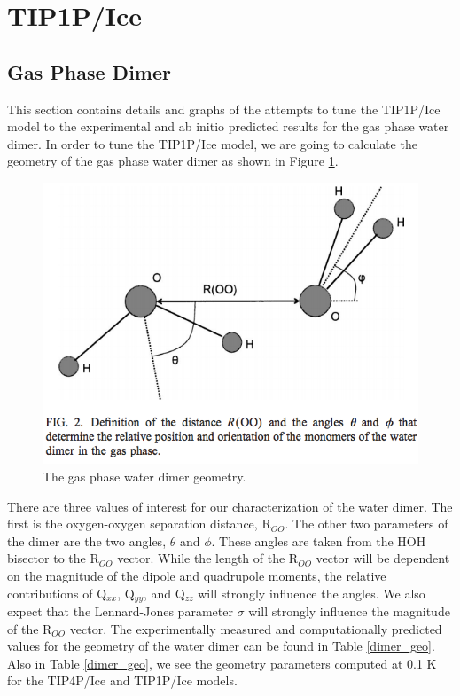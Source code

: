 \section{TIP1P/Ice}
\subsection{Gas Phase Dimer}
This section contains details and graphs of the attempts to tune the TIP1P/Ice
model to the experimental and ab initio predicted results for the gas phase
water dimer. In order to tune the TIP1P/Ice model, we are going to calculate 
the geometry of the gas phase water dimer as shown in Figure 
\ref{fig:dimer}\cite{Yu04}.

\begin{figure}[h!]
\includegraphics[width = \linewidth]{Figures/dimer.pdf}
\caption{\label{fig:dimer} The gas phase water dimer geometry.}
\end{figure}

There are three values of interest for our characterization of the water dimer.
The first is the oxygen-oxygen separation distance, R$_{OO}$. The other two
parameters of the dimer are the two angles, $\theta$ and $\phi$. These angles
are taken from the HOH bisector to the R$_{OO}$ vector. While the length
of the R$_{OO}$ vector will be dependent on the magnitude of the dipole and 
quadrupole moments, the relative contributions of Q$_{xx}$, Q$_{yy}$, and
Q$_{zz}$ will strongly influence the angles. We also expect that the 
Lennard-Jones parameter $\sigma$ will strongly influence the magnitude of
the R$_{OO}$ vector.
The experimentally measured and computationally predicted values for the 
geometry of the water
dimer can be found in Table \ref{dimer_geo}. Also in Table \ref{dimer_geo}, we
see the geometry parameters computed at 0.1 K for the TIP4P/Ice and TIP1P/Ice
models.

